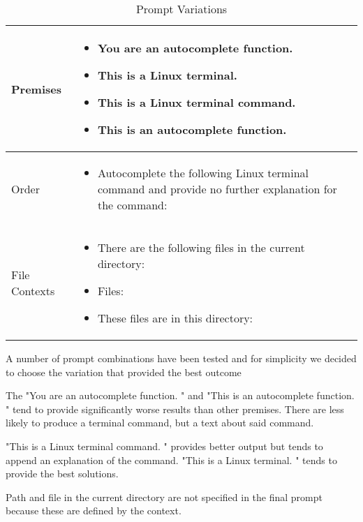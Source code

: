 \begin{table}[htbp]
    \centering
    \caption{Prompt Variations}
    \begin{tabular}{|p{5cm}|p{8cm}|}
        \hline
        Premises & 
        \begin{itemize}
            \item You are an autocomplete function.
            \item This is a Linux terminal.
            \item This is a Linux terminal command.
            \item This is an autocomplete function.
        \end{itemize}
        \\
        \hline
        Order & 
        \begin{itemize}
            \item Autocomplete the following Linux terminal command and provide no further explanation for the command:
        \end{itemize}
        \\
        \hline
        File Contexts & 
        \begin{itemize}
            \item There are the following files in the current directory:
            \item Files:
            \item These files are in this directory:
        \end{itemize}
        \\
        \hline
    \end{tabular}
\end{table}


 

A number of prompt combinations have been tested and for simplicity we decided to choose the variation that provided the best outcome 



The "You are an autocomplete function. " and "This is an autocomplete function. " tend to provide significantly worse results than other premises. There are less likely to produce a terminal command, but a text about said command.


"This is a Linux terminal command. " provides better output but tends to append an explanation of the command. "This is a Linux terminal. " tends to provide the best solutions. 




Path and file in the current directory are not specified in the final prompt because these are defined by the context.



